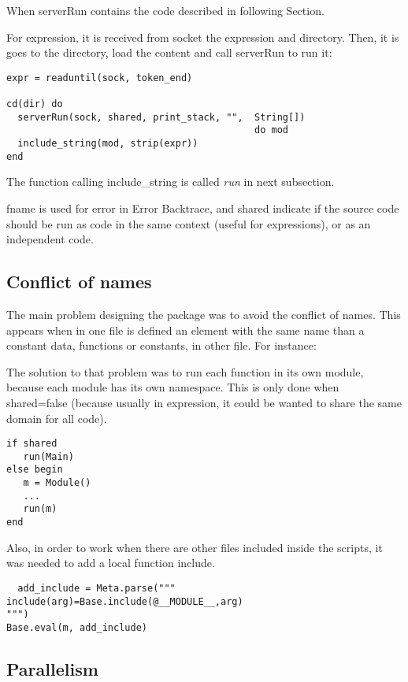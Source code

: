\documentclass{juliacon}
\begin{document}
When serverRun contains the code described in following Section.

For expression, it is received from socket the expression and directory. Then, it is
goes to the directory, load the content and call serverRun to run it:

\begin{lstlisting}
expr = readuntil(sock, token_end)

cd(dir) do
  serverRun(sock, shared, print_stack, "",  String[]) 
                                            do mod
  include_string(mod, strip(expr))
end
\end{lstlisting}

The function calling include\_string is called \textit{run} in next subsection.

fname is used for error in Error Backtrace, and shared indicate if the source
code should be run as code in the same context (useful for expressions), or as an
independent code. 

\subsection{Conflict of names}

The main problem designing the package was to avoid the conflict of names. This
appears when in one file is defined an element with the same name than a constant
data, functions or constants, in other file. For instance:




The solution to that problem was to run each function in its own module, because
each module has its own namespace. This is only done when shared=false (because
usually in expression, it could be wanted to share the same domain for all code).

\begin{lstlisting}
if shared
   run(Main)
else begin
   m = Module()
   ...
   run(m)
end
\end{lstlisting}

Also, in order to work when there are other files included inside the scripts,
it was needed to add a local function include.

\begin{lstlisting}
  add_include = Meta.parse("""
include(arg)=Base.include(@__MODULE__,arg)
""")
Base.eval(m, add_include)
\end{lstlisting}

\subsection{Parallelism}
\end{document}
